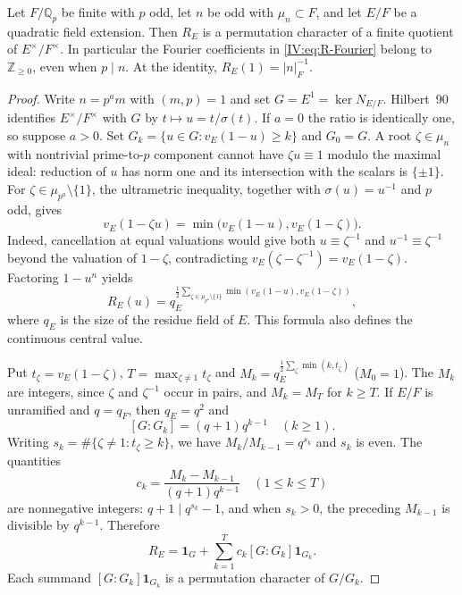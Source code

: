 \begin{theorem}
\label{IV:thm:quad-toral}
Let $F/\mathbb Q_p$ be finite with $p$ odd, let $n$ be odd with
$\mu_n\subset F$, and let $E/F$ be a quadratic field extension.
Then $R_E$ is a permutation character of a finite quotient of
$E^\times/F^\times$.  In particular the Fourier coefficients in
\eqref{IV:eq:R-Fourier} belong to $\mathbb Z_{\ge0}$, even when $p\mid n$.
At the identity, $R_E(1)=|n|_F^{-1}$.
\end{theorem}
\begin{proof}
Write $n=p^a m$ with $(m,p)=1$ and set
$G=E^1=\ker N_{E/F}$.  Hilbert~90 identifies $E^\times/F^\times$
with $G$ by $t\mapsto u=t/\sigma(t)$.
If $a=0$ the ratio is identically one, so suppose $a>0$.
Set $G_k=\{u\in G:v_E(1-u)\ge k\}$ and $G_0=G$.
A root $\zeta\in\mu_n$ with nontrivial prime-to-$p$ component
cannot have $\zeta u\equiv1$ modulo the maximal ideal: reduction of
$u$ has norm one and its intersection with the scalars is $\{\pm1\}$.
For $\zeta\in\mu_{p^a}\setminus\{1\}$, the ultrametric inequality,
together with $\sigma(u)=u^{-1}$ and $p$ odd, gives
\[
v_E(1-\zeta u)=\min\bigl(v_E(1-u),v_E(1-\zeta)\bigr).
\]
Indeed, cancellation at equal valuations would give both
$u\equiv\zeta^{-1}$ and $u^{-1}\equiv\zeta^{-1}$ beyond the
valuation of $1-\zeta$, contradicting
$v_E(\zeta-\zeta^{-1})=v_E(1-\zeta)$.
Factoring $1-u^n$ yields
\begin{equation}\label{IV:eq:toralradial}
R_E(u)=q_E^{\frac12\sum_{\zeta\in\mu_{p^a}\setminus\{1\}}
\min(v_E(1-u),v_E(1-\zeta))},
\end{equation}
where $q_E$ is the size of the residue field of $E$.
This formula also defines the continuous central value.

Put $t_\zeta=v_E(1-\zeta)$,
$T=\max_{\zeta\ne1}t_\zeta$ and
$M_k=q_E^{\frac12\sum_\zeta\min(k,t_\zeta)}$ ($M_0=1$).
The $M_k$ are integers, since $\zeta$ and $\zeta^{-1}$ occur
in pairs, and $M_k=M_T$ for $k\ge T$.
If $E/F$ is unramified and $q=q_F$, then $q_E=q^2$ and
\[
[G:G_k]=(q+1)q^{k-1}\quad(k\ge1).
\]
Writing $s_k=\#\{\zeta\ne1:t_\zeta\ge k\}$, we have
$M_k/M_{k-1}=q^{s_k}$ and $s_k$ is even.  The quantities
\[
c_k=\frac{M_k-M_{k-1}}{(q+1)q^{k-1}}
\quad (1\le k\le T)
\]
are nonnegative integers: $q+1\mid q^{s_k}-1$, and when
$s_k>0$, the preceding $M_{k-1}$ is divisible by $q^{k-1}$.
Therefore
\[
R_E=\mathbf1_G+\sum_{k=1}^{T}c_k[G:G_k]\mathbf1_{G_k}.
\]
Each summand $[G:G_k]\mathbf1_{G_k}$ is a permutation
character of $G/G_k$.


\end{proof}
